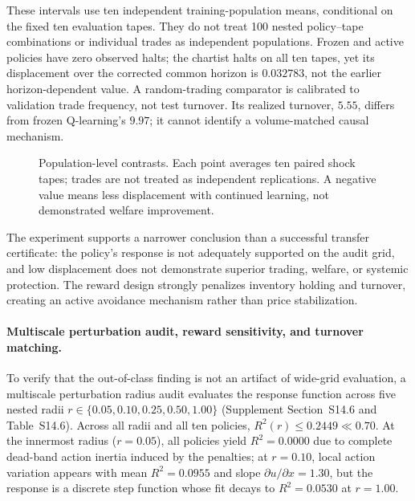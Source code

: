 \documentclass[10pt,twocolumn,letterpaper]{article}
\theoremstyle{definition}
\theoremstyle{remark}
\begin{document}
These intervals use ten independent training-population means, conditional on the fixed ten evaluation tapes. They do not treat 100 nested policy--tape combinations or individual trades as independent populations. Frozen and active policies have zero observed halts; the chartist halts on all ten tapes, yet its displacement over the corrected common horizon is $0.032783$, not the earlier horizon-dependent value. A random-trading comparator is calibrated to validation trade frequency, not test turnover. Its realized turnover, $5.55$, differs from frozen Q-learning's $9.97$; it cannot identify a volume-matched causal mechanism.
\begin{figure}[htbp]\centering
{}
\caption{Population-level contrasts. Each point averages ten paired shock tapes; trades are not treated as independent replications. A negative value means less displacement with continued learning, not demonstrated welfare improvement.}
\label{fig:corrected_learning_effects}\end{figure}

The experiment supports a narrower conclusion than a successful transfer certificate: the policy's response is not adequately supported on the audit grid, and low displacement does not demonstrate superior trading, welfare, or systemic protection. The reward design strongly penalizes inventory holding and turnover, creating an active avoidance mechanism rather than price stabilization.

\paragraph{Multiscale perturbation audit, reward sensitivity, and turnover matching.}
To verify that the out-of-class finding is not an artifact of wide-grid evaluation, a multiscale perturbation radius audit evaluates the response function across five nested radii $r \in \{0.05, 0.10, 0.25, 0.50, 1.00\}$ (Supplement Section~S14.6 and Table~S14.6). Across all radii and all ten policies, $R^2(r) \le 0.2449 \ll 0.70$. At the innermost radius ($r = 0.05$), all policies yield $R^2 = 0.0000$ due to complete dead-band action inertia induced by the penalties; at $r = 0.10$, local action variation appears with mean $R^2 = 0.0955$ and slope $\partial u/\partial x = 1.30$, but the response is a discrete step function whose fit decays to $R^2 = 0.0530$ at $r = 1.00$.
\end{document}
